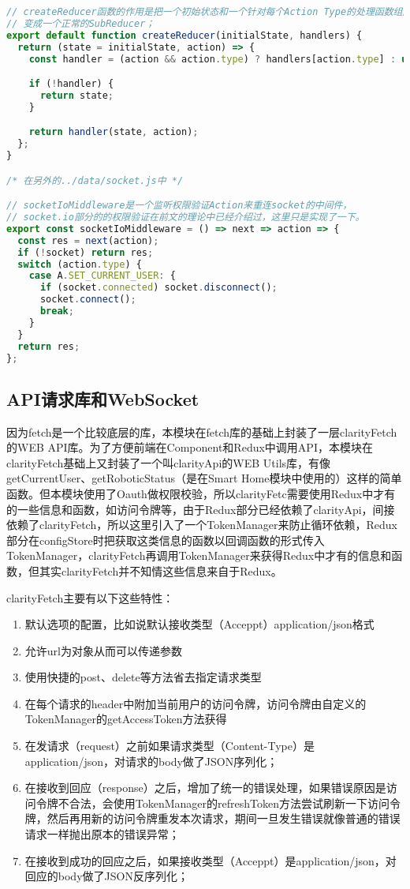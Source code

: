 \begin{lstlisting}[language={JavaScript}, caption={Smart City模块权限校验Redux数据流相关代码}]
// createReducer函数的作用是把一个初始状态和一个针对每个Action Type的处理函数组成的Map，
// 变成一个正常的SubReducer；
export default function createReducer(initialState, handlers) {
  return (state = initialState, action) => {
    const handler = (action && action.type) ? handlers[action.type] : undefined;

    if (!handler) {
      return state;
    }

    return handler(state, action);
  };
}

/* 在另外的../data/socket.js中 */

// socketIoMiddleware是一个监听权限验证Action来重连socket的中间件，
// socket.io部分的的权限验证在前文的理论中已经介绍过，这里只是实现了一下。
export const socketIoMiddleware = () => next => action => {
  const res = next(action);
  if (!socket) return res;
  switch (action.type) {
    case A.SET_CURRENT_USER: {
      if (socket.connected) socket.disconnect();
      socket.connect();
      break;
    }
  }
  return res;
};
\end{lstlisting}
\subsection{API请求库和WebSocket}
因为fetch是一个比较底层的库，本模块在fetch库的基础上封装了一层clarityFetch的WEB API库。为了方便前端在Component和Redux中调用API，本模块在clarityFetch基础上又封装了一个叫clarityApi的WEB Utils库，有像getCurrentUser、getRoboticStatus（是在Smart Home模块中使用的）这样的简单函数。但本模块使用了Oauth做权限校验，所以clarityFetc需要使用Redux中才有的一些信息和函数，如访问令牌等，由于Redux部分已经依赖了clarityApi，间接依赖了clarityFetch，所以这里引入了一个TokenManager来防止循环依赖，Redux部分在configStore时把获取这类信息的函数以回调函数的形式传入TokenManager，clarityFetch再调用TokenManager来获得Redux中才有的信息和函数，但其实clarityFetch并不知情这些信息来自于Redux。

clarityFetch主要有以下这些特性：
\begin{enumerate}
  \item 默认选项的配置，比如说默认接收类型（Acceppt）application/json格式
  \item 允许url为对象从而可以传递参数
  \item 使用快捷的post、delete等方法省去指定请求类型
  \item 在每个请求的header中附加当前用户的访问令牌，访问令牌由自定义的TokenManager的getAccessToken方法获得
  \item 在发请求（request）之前如果请求类型（Content-Type）是application/json，对请求的body做了JSON序列化；
  \item 在接收到回应（response）之后，增加了统一的错误处理，如果错误原因是访问令牌不合法，会使用TokenManager的refreshToken方法尝试刷新一下访问令牌，然后再用新的访问令牌重发本次请求，期间一旦发生错误就像普通的错误请求一样抛出原本的错误异常；
  \item 在接收到成功的回应之后，如果接收类型（Acceppt）是application/json，对回应的body做了JSON反序列化；
\end{enumerate}

